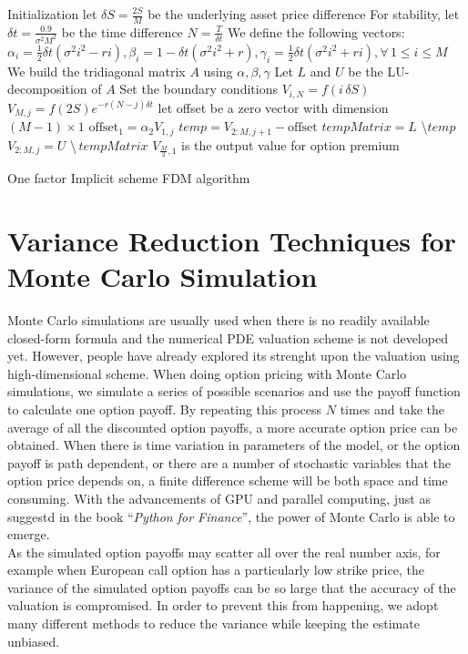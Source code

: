 \begin{algorithm}[H]
 Initialization\;
 let $\delta S = \frac{2S}{M}$ be the underlying asset price difference \;
 For stability, let $\delta t = \frac{0.9}{\sigma^{2}M^{2}}$ be the time difference\;
 $N = \frac{T}{\delta t}$\;
 We define the following vectors:\\
 $\alpha_{i} = \frac{1}{2}\delta t(\sigma^{2}i^{2} - ri), \beta_{i} = 1-\delta t(\sigma^{2}i^{2} + r), \gamma_{i} = \frac{1}{2}\delta t(\sigma^{2}i^{2} + ri), \forall \, 1 \le i \le M$\;
 We build the tridiagonal matrix $A$ using $\alpha, \beta, \gamma$\;
 Let $L$ and $U$ be the LU-decomposition of $A$\;
 Set the boundary conditions\;
  {
  $V_{i, N} = f(i\,\delta S)$\;
 }
  {
  $V_{M, j} = f(2S)e^{-r(N-j)\delta t}$\;
 }
 let offset be a zero vector with dimension $(M-1) \times 1$\;
  {
  $\text{offset}_{1} = \alpha_{2} V_{1, j}$\;
  $temp =  V_{2:M, j+1} - \text{offset}$\;
  $tempMatrix =  L$ \textbackslash $temp$\;
  $V_{2:M, j} = U$ \textbackslash $\,tempMatrix$\;
 }
 $V_{\frac{M}{2},1}$ is the output value for option premium\;
\caption{One factor Implicit scheme FDM algorithm}
\end{algorithm}
\newpage

\section{Variance Reduction Techniques for Monte Carlo Simulation}
Monte Carlo simulations are usually used when there is no readily available closed-form formula and the numerical PDE valuation scheme is not developed yet. However, people have already explored its strenght upon the valuation using high-dimensional scheme. When doing option pricing with Monte Carlo simulations, we simulate a series of possible scenarios and use the payoff function to calculate one option payoff. By repeating this process $N$ times and take the average of all the discounted option payoffs, a more accurate option price can be obtained. When there is time variation in parameters of the model, or the option payoff is path dependent, or there are a number of stochastic variables that the option price depends on, a finite difference scheme will be both space and time consuming. With the advancements of GPU and parallel computing, just as suggestd in the book ``\emph{Python for Finance}'', the power of Monte Carlo is able to emerge.\\
As the simulated option payoffs may scatter all over the real number axis, for example when European call option has a particularly low strike price, the variance of the simulated option payoffs can be so large that the accuracy of the valuation is compromised. In order to prevent this from happening, we adopt many different methods to reduce the variance while keeping the estimate unbiased.
\newpage
